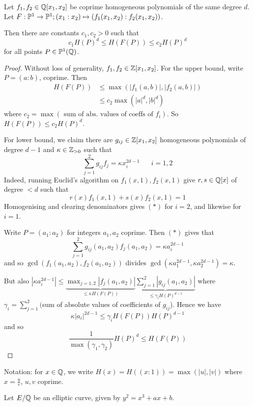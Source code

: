 \documentclass[10pt,a4paper]{article}
\begin{document}
\begin{lemma}
  Let $f_1, f_2 \in \Q[x_1, x_2]$ be coprime homogeneous polynomials of the same degree $d$. Let $F:\P^1 \to \P^1; (x_1:x_2) \mapsto (f_1(x_1,x_2):f_2(x_1, x_2))$.

  Then there are constants $c_1, c_2 > 0$ such that
  \[c_1H(P)^d \leq H(F(P)) \leq c_2H(P)^d\]
  for all points $P \in \P^1(\Q)$.
\end{lemma}
\begin{proof}
  Without loss of generality, $f_1, f_2 \in \Z[x_1, x_2]$. For the upper bound, write $P = (a:b)$, coprime. Then
  \begin{align*}
    H(F(P)) & \leq \max(|f_1(a,b)|, |f_2(a,b)|)\\
    &\leq c_2 \max (|a|^d, |b|^d)
  \end{align*}
  where $c_2 = \max (\text{ sum of abs. values of coeffs of $f_i$})$.
  So $H(F(P)) \leq c_2 H(P)^d$.

   For lower bound, we claim there are $g_{ij} \in \Z[x_1, x_2]$ homogeneous polynomials of degree $d-1$ and $\kappa \in \Z_{>0}$ such that
   \[\sum_{j=1}^2 g_{ij}f_j = \kappa x_i^{2d-1}\;\;\;\;\;\; i=1,2\tag{$\ast$}\]
   Indeed, running Euclid's algorithm on $f_1(x,1), f_2(x,1)$ give $r, s \in \Q[x]$ of degree $<d$ such that
   \[r(x)f_1(x, 1) + s(x)f_2(x, 1) = 1\]
   Homogenising and clearing denominators gives $(\ast)$ for $i=2$, and likewise for $i=1$.

   Write $P = (a_1:a_2)$ for integers $a_1, a_2$ coprime. Then $(\ast)$ gives that
   \[\sum_{j=1}^2 g_{ij}(a_1, a_2)f_j(a_1, a_2) = \kappa a_i^{2d-1}\]
   and so $\gcd(f_1(a_1, a_2), f_2(a_1,a_2))$ divides $\gcd(\kappa a_1^{2d-1}, \kappa a_2^{2d-1}) = \kappa$.

   But also $|\kappa a_i^{2d-1}| \leq \underbrace{\max_{j=1,2} |f_j(a_1, a_2)|}_{\leq \kappa H(F(P))}\underbrace{\sum_{j=1}^2 |g_{ij}(a_1, a_2)|}_{\leq \gamma_i H(P)^{d-1}}$ where $\gamma_i = \sum_{j=1}^2 ($sum of absolute values of coefficients of $g_{ij}$). Hence we have
   \[\kappa |a_i|^{2d-1} \leq \gamma_i H(F(P))H(P)^{d-1}\]
   and so
   \[\frac{1}{\max (\gamma_1, \gamma_2)}H(P)^{d} \leq H(F(P))\]
\end{proof}
Notation: for $x \in \Q$, we write $H(x) = H((x:1)) = \max(|u|, |v|)$ where $x = \frac{u}{v}$, $u, v$ coprime.

Let $E/\Q$ be an elliptic curve, given by $y^2=x^3+ax+b$.
\end{document}
